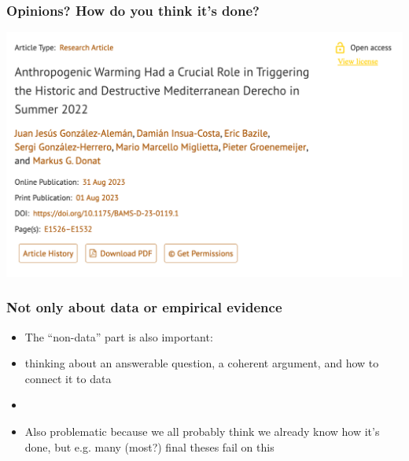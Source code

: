 \documentclass[aspectratio=43]{beamer}
\begin{document}



\begin{frame}
\frametitle{Opinions? How do you think it's done?}
\centering

\includegraphics[width = \textwidth]{../img/derecho2022c}

\end{frame}


\begin{frame}
\frametitle{Not only about data or empirical evidence}
\centering

\begin{itemize}
  \item The ``non-data'' part is also important:
  \item[] thinking about an answerable question, a coherent argument, and how to connect it to data
  \item[]
  \item Also problematic because we all probably think we already know how it's done, but e.g. many (most?) final theses fail on this
\end{itemize}

\end{frame}
  
\end{document}
